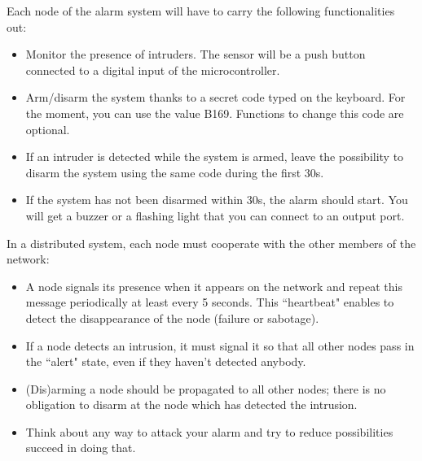 \documentclass[10pt,a4paper]{article}
\theoremstyle{definition}%
\begin{document}
Each node of the alarm system will have to carry the following functionalities out:
\begin{itemize}
\item Monitor the presence of intruders. %
The sensor will be a push button connected to a digital input of the microcontroller.

\item Arm/disarm the system thanks to a secret code typed on the keyboard. For the moment, you can
use the value B169. Functions to change this code are optional.
\item If an intruder is detected while the system is armed, leave the possibility to disarm the
system using the same code during the first 30s.
\item If the system has not been disarmed within 30s, the alarm should start. You will get a
buzzer or a flashing light that you can connect to an output port.
\end{itemize}

\vspace{0.5cm}

In a distributed system, each node must cooperate with the other members of the network:
\begin{itemize}
\item A node signals its presence when it appears on the network and repeat this message
periodically at least every 5 seconds. This ``heartbeat" enables to detect the disappearance
of the node (failure or sabotage).
\item If a node detects an intrusion, it must signal it so that all other nodes pass in the ``alert"
state, even if they haven't detected anybody.
\item (Dis)arming a node should be propagated to all other nodes; there is no obligation to disarm
at the node which has detected the intrusion.
\item Think about any way to attack your alarm and try to reduce possibilities succeed in doing that.
\end{itemize}

\newpage
\end{document}
